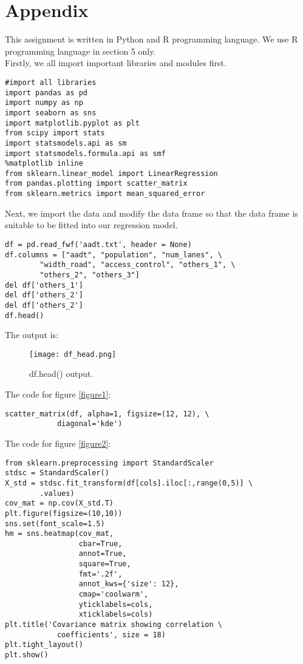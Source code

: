 \documentclass[english]{article}
\begin{document}
\section{Appendix}

This assignment is written in Python and R programming language. We use R programming language in section 5 only. \\
Firstly, we all import important libraries and modules first. 
\begin{lstlisting}[frame=trBL]
#import all libraries
import pandas as pd
import numpy as np
import seaborn as sns
import matplotlib.pyplot as plt
from scipy import stats
import statsmodels.api as sm
import statsmodels.formula.api as smf
%matplotlib inline
from sklearn.linear_model import LinearRegression
from pandas.plotting import scatter_matrix
from sklearn.metrics import mean_squared_error
\end{lstlisting}

Next, we import the data and modify the data frame so that the data frame is suitable to be fitted into our regression model. 

\begin{lstlisting}[frame=trBL]
df = pd.read_fwf('aadt.txt', header = None)
df.columns = ["aadt", "population", "num_lanes", \
        "width_road", "access_control", "others_1", \
        "others_2", "others_3"]
del df['others_1']
del df['others_2']
del df['others_2']
df.head()
\end{lstlisting}

The output is:
\begin{figure}[H]
    	\begin{centering}
      		\texttt{[image: df\_head.png]}
      		\caption{df.head() output. \label{fig: floatfigure}
    }
    	\end{centering}
\end{figure}

The code for figure \ref{figure1}: 
\begin{lstlisting}[frame=trBL]
scatter_matrix(df, alpha=1, figsize=(12, 12), \
            diagonal='kde') 
\end{lstlisting}

The code for figure \ref{figure2}:
\begin{lstlisting}[frame=trBL]
from sklearn.preprocessing import StandardScaler 
stdsc = StandardScaler() 
X_std = stdsc.fit_transform(df[cols].iloc[:,range(0,5)] \
        .values)
cov_mat = np.cov(X_std.T)
plt.figure(figsize=(10,10))
sns.set(font_scale=1.5)
hm = sns.heatmap(cov_mat,
                 cbar=True,
                 annot=True,
                 square=True,
                 fmt='.2f',
                 annot_kws={'size': 12},
                 cmap='coolwarm',                 
                 yticklabels=cols,
                 xticklabels=cols)
plt.title('Covariance matrix showing correlation \ 
            coefficients', size = 18)
plt.tight_layout()
plt.show()
\end{lstlisting}
\end{document}
